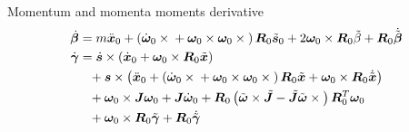 \documentclass[10pt,fleqn,subeqn]{report}
\newcommand{\T}[1]{\bm{#1}}
\newcommand{\TT}[1]{\bm{#1}}
\begin{document}
Momentum and momenta moments derivative
\begin{subequations}
\begin{align}
	\dot{\T{\beta}}
	&= m \ddot{\T{x}}_0
	+ \plbr{
		\dot{\T{\omega}}_0 \times{}
		+ \T{\omega}_0 \times \T{\omega}_0 \times{}
	} \TT{R}_0 \tilde{\T{s}}_0
	+ 2 \T{\omega}_0 \times \TT{R}_0 \tilde{\beta}
	+ \TT{R}_0 \dot{\tilde{\T{\beta}}} \\
	\dot{\T{\gamma}}
	&= \dot{\T{s}} \times \plbr{
		\dot{\T{x}}_0
		+ \T{\omega}_0 \times \TT{R}_0 \tilde{\T{x}}
	}
	\nonumber \\
	&\hphantom{=}+ \T{s} \times \plbr{
		\ddot{\T{x}}_0
		+ \plbr{
			\dot{\T{\omega}}_0 \times{}
			+ \T{\omega}_0 \times \T{\omega}_0 \times{}
		} \TT{R}_0 \tilde{\T{x}}
		+ \T{\omega}_0 \times \TT{R}_0 \dot{\tilde{\T{x}}}
	}
	\nonumber \\
	&\hphantom{=}+ \T{\omega}_0 \times \TT{J} \T{\omega}_0
	+ \TT{J} \dot{\T{\omega}}_0
	+ \TT{R}_0 \plbr{
		\tilde{\T{\omega}} \times \tilde{\TT{J}}
		- \tilde{\TT{J}} \tilde{\T{\omega}} \times{}
	} \TT{R}_0^T \T{\omega}_0
	\nonumber \\
	&\hphantom{=}+ \T{\omega}_0 \times \TT{R}_0 \tilde{\T{\gamma}}
	+ \TT{R}_0 \dot{\tilde{\T{\gamma}}}
\end{align}
\end{subequations}
\end{document}

